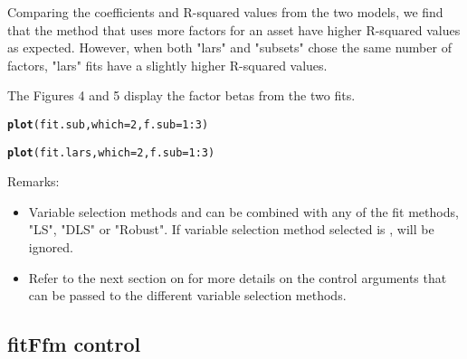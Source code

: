 \documentclass[a4paper]{article}\usepackage[]{graphicx}\usepackage[]{color}
\makeatletter
\newcommand{\hlnum}[1]{\textcolor[rgb]{0.686,0.059,0.569}{#1}}%
\newcommand{\hlopt}[1]{\textcolor[rgb]{0,0,0}{#1}}%
\newcommand{\hlstd}[1]{\textcolor[rgb]{0.345,0.345,0.345}{#1}}%
\newcommand{\hlkwc}[1]{\textcolor[rgb]{0.333,0.667,0.333}{#1}}%
\newcommand{\hlkwd}[1]{\textcolor[rgb]{0.737,0.353,0.396}{\textbf{#1}}}%
\newenvironment{kframe}{%
 \def\at@end@of@kframe{}%
 \ifinner\ifhmode%
  \def\at@end@of@kframe{\end{minipage}}%
  \begin{minipage}{\columnwidth}%
 \fi\fi%
 \def\FrameCommand##1{\hskip\@totalleftmargin \hskip-\fboxsep
 \colorbox{shadecolor}{##1}\hskip-\fboxsep
     \hskip-\linewidth \hskip-\@totalleftmargin \hskip\columnwidth}%
 \MakeFramed {\advance\hsize-\width
   \@totalleftmargin\z@ \linewidth\hsize
   \@setminipage}}%
 {\par\unskip\endMakeFramed%
 \at@end@of@kframe}
\newenvironment{knitrout}{}{} %
\makeatother
\begin{document}
Comparing the coefficients and R-squared values from the two models, we find that the method that uses more factors for an asset have higher R-squared values as expected. However, when both "lars" and "subsets" chose the same number of factors, "lars" fits have a slightly higher R-squared values.  

The Figures 4 and 5 display the factor betas from the two fits.
\begin{knitrout}
\color{fgcolor}\begin{kframe}
\begin{alltt}
\hlkwd{plot}\hlstd{(fit.sub,} \hlkwc{which}\hlstd{=}\hlnum{2}\hlstd{,} \hlkwc{f.sub}\hlstd{=}\hlnum{1}\hlopt{:}\hlnum{3}\hlstd{)}
\end{alltt}


{\ttfamily\noindent\bfseries\color{errorcolor}{\#\# Error in plot(fit.sub, which = 2, f.sub = 1:3): object 'fit.sub' not found}}\end{kframe}
\end{knitrout}

\begin{knitrout}
\color{fgcolor}\begin{kframe}
\begin{alltt}
\hlkwd{plot}\hlstd{(fit.lars,} \hlkwc{which}\hlstd{=}\hlnum{2}\hlstd{,} \hlkwc{f.sub}\hlstd{=}\hlnum{1}\hlopt{:}\hlnum{3}\hlstd{)}
\end{alltt}


{\ttfamily\noindent\bfseries\color{errorcolor}{\#\# Error in plot(fit.lars, which = 2, f.sub = 1:3): object 'fit.lars' not found}}\end{kframe}
\end{knitrout}

Remarks:
\begin{itemize}
\item Variable selection methods  and  can be combined with any of the fit methods, "LS", "DLS" or "Robust". If variable selection method selected is ,  will be ignored. 
\item Refer to the next section on  for more details on the control arguments that can be passed to the different variable selection methods. 
\end{itemize}

\subsection{fitFfm control}
\end{document}
